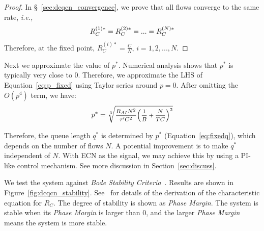 \begin{proof}
In \S~\ref{sec:dcqcn_convergence}, we prove that all flows converge to the same rate, {\em i.e.,}
\begin{equation}
\small
R_C^{(1)*} = R_C^{(2)*} = ... = R_C^{(N)*}
\end{equation}
Therefore, at the fixed point, $R_C^{(i)*} = \frac{C}{N}$, $i = 1, 2, ..., N$.
\end{proof}

Next we approximate the value of $p^*$. Numerical analysis shows that $p^*$ is 
typically very close to 0. Therefore, we approximate the LHS of Equation~\ref{eq:p_fixed} 
using Taylor series around $p=0$.
After omitting the $O(p^4)$ term, we have:
\begin{equation}
\small
{p^*} = \sqrt[3]{{\frac{{{R_{AI}N^2}}}{{{\tau '}C^2}}{{\left( {\frac{1}{B} + \frac{N}{TC}} \right)}^2}}}
\label{eq:fixedp}
\end{equation}

Therefore, the queue length $q^*$ is determined by $p^*$ (Equation~\ref{eq:fixedq}), which depends on 
the number of flows $N$. A potential improvement is to make $q^*$ independent of 
$N$. With ECN as the signal, we may achieve this
by using a PI-like control mechanism. See more discussion in Section~\ref{sec:discuss}.



We test the system against {\em Bode Stability Criteria}~\cite{controltheory}. 
Results are shown in Figure~\ref{fig:dcqcn_stability}. See~\cite{fullpaper} for
details of the derivation of the characteristic equation for $R_C$.
The degree of stability is shown as {\em
Phase Margin}. The system is stable when its {\em Phase Margin} is larger than
0, and the larger {\em Phase Margin} means the system is more stable.

